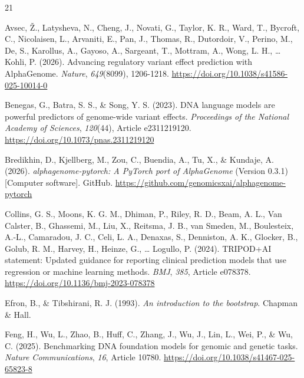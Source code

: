 \begin{thebibliography}{21}
\setlength{\itemsep}{0pt}

Avsec, {\v Z}., Latysheva, N., Cheng, J., Novati, G., Taylor, K. R., Ward, T., Bycroft, C., Nicolaisen, L., Arvaniti, E., Pan, J., Thomas, R., Dutordoir, V., Perino, M., De, S., Karollus, A., Gayoso, A., Sargeant, T., Mottram, A., Wong, L. H., \ldots{} Kohli, P. (2026). Advancing regulatory variant effect prediction with AlphaGenome. \textit{Nature}, \textit{649}(8099), 1206-1218. \url{https://doi.org/10.1038/s41586-025-10014-0}

Benegas, G., Batra, S. S., \& Song, Y. S. (2023). DNA language models are powerful predictors of genome-wide variant effects. \textit{Proceedings of the National Academy of Sciences}, \textit{120}(44), Article e2311219120. \url{https://doi.org/10.1073/pnas.2311219120}

Bredikhin, D., Kjellberg, M., Zou, C., Buendia, A., Tu, X., \& Kundaje, A. (2026). \textit{alphagenome-pytorch: A PyTorch port of AlphaGenome} (Version 0.3.1) [Computer software]. GitHub. \url{https://github.com/genomicsxai/alphagenome-pytorch}

Collins, G. S., Moons, K. G. M., Dhiman, P., Riley, R. D., Beam, A. L., Van Calster, B., Ghassemi, M., Liu, X., Reitsma, J. B., van Smeden, M., Boulesteix, A.-L., Camaradou, J. C., Celi, L. A., Denaxas, S., Denniston, A. K., Glocker, B., Golub, R. M., Harvey, H., Heinze, G., \ldots{} Logullo, P. (2024). TRIPOD+AI statement: Updated guidance for reporting clinical prediction models that use regression or machine learning methods. \textit{BMJ}, \textit{385}, Article e078378. \url{https://doi.org/10.1136/bmj-2023-078378}

Efron, B., \& Tibshirani, R. J. (1993). \textit{An introduction to the bootstrap}. Chapman \& Hall.

Feng, H., Wu, L., Zhao, B., Huff, C., Zhang, J., Wu, J., Lin, L., Wei, P., \& Wu, C. (2025). Benchmarking DNA foundation models for genomic and genetic tasks. \textit{Nature Communications}, \textit{16}, Article 10780. \url{https://doi.org/10.1038/s41467-025-65823-8}


\end{thebibliography}
